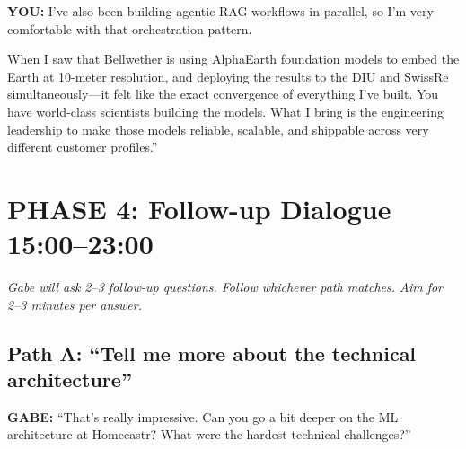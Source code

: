 \documentclass[11pt,letterpaper]{article}
\newenvironment{gabe}{\begin{mdframed}[backgroundcolor=gabebg,linewidth=0pt,innertopmargin=8pt,innerbottommargin=8pt]\textbf{\color{xred}GABE:} }{\end{mdframed}}
\newenvironment{you}{\begin{mdframed}[backgroundcolor=youbg,linewidth=0pt,innertopmargin=8pt,innerbottommargin=8pt]\textbf{\color{xblue}YOU:} }{\end{mdframed}}
\newcommand{\stage}[1]{{\small\color{xgray}\textit{#1}}}
\begin{document}
\begin{you}
I've also been building agentic RAG workflows in parallel, so I'm very comfortable with that orchestration pattern.

When I saw that Bellwether is using AlphaEarth foundation models to embed the Earth at 10-meter resolution, and deploying the results to the DIU and SwissRe simultaneously---it felt like the exact convergence of everything I've built. You have world-class scientists building the models. What I bring is the engineering leadership to make those models reliable, scalable, and shippable across very different customer profiles.''
\end{you}

\section*{PHASE 4: Follow-up Dialogue \hfill {\color{xgray}\normalsize 15:00--23:00}}

\stage{Gabe will ask 2--3 follow-up questions. Follow whichever path matches. Aim for 2--3 minutes per answer.}

\subsection*{Path A: ``Tell me more about the technical architecture''}

\begin{gabe}
``That's really impressive. Can you go a bit deeper on the ML architecture at Homecastr? What were the hardest technical challenges?''
\end{gabe}
\end{document}
